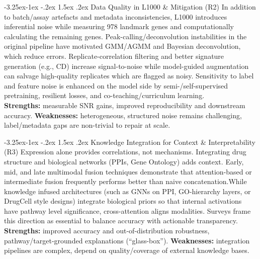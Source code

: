 \documentclass[12pt,a4paper]{article}
\makeatletter
\renewcommand\subsection{\@startsection{subsection}{2}{\z@}%
  {-3.25ex\@plus-1ex \@minus-.2ex}%
  {1.5ex \@plus.2ex}%
  {\normalfont\normalsize\bfseries}}
\makeatother
\begin{document}
\subsection{Data Quality in L1000 \& Mitigation (R2)}
In addition to batch/assay artefacts and metadata inconsistencies, L1000 introduces inferential noise while measuring 978 landmark genes and computationally calculating the remaining genes\cite{subramanian2017next,mcdermott2019deep}. Peak-calling/deconvolution instabilities in the original pipeline have motivated GMM/AGMM and Bayesian deconvolution, which reduce errors\cite{qiu2020bayesian}. Replicate-correlation filtering and better signature generation (e.g., CD) increase signal-to-noise while model-guided augmentation can salvage high-quality replicates which are flagged as noisy\cite{szalai2019signatures,duan2016l1000cds2,pham2021deep}. Sensitivity to label and feature noise is enhanced on the model side by semi-/self-supervised pretraining, resilient losses, and co-teaching/curriculum learning.\\
\textbf{Strengths:} measurable SNR gains, improved reproducibility and downstream accuracy.
\textbf{Weaknesses:} heterogeneous, structured noise remains challenging, label/metadata gaps are non-trivial to repair at scale.

\subsection{Knowledge Integration for Context \& Interpretability (R3)}
Expression alone provides correlations, not mechanisms. Integrating drug structure and biological networks (PPIs, Gene Ontology) adds context\cite{liu2015compound}. Early, mid, and late multimodal fusion techniques demonstrate that attention-based or intermediate fusion frequently performs better than naive concatenation\cite{stahlschmidt2022multimodal}.While knowledge infused architectures (such as GNNs on PPI, GO-hierarchy layers, or DrugCell style designs) integrate biological priors so that internal activations have pathway level significance, cross-attention aligns modalities\cite{elabd2024simple,mcdermott2019deep,samal2022opportunities}. Surveys frame this direction as essential to balance accuracy with actionable transparency\cite{chow2022predicting}.\\
\textbf{Strengths:} improved accuracy and out-of-distribution robustness, pathway/target-grounded explanations (\enquote{glass-box}).
\textbf{Weaknesses:} integration pipelines are complex, depend on quality/coverage of external knowledge bases.
\\ \\
\end{document}
